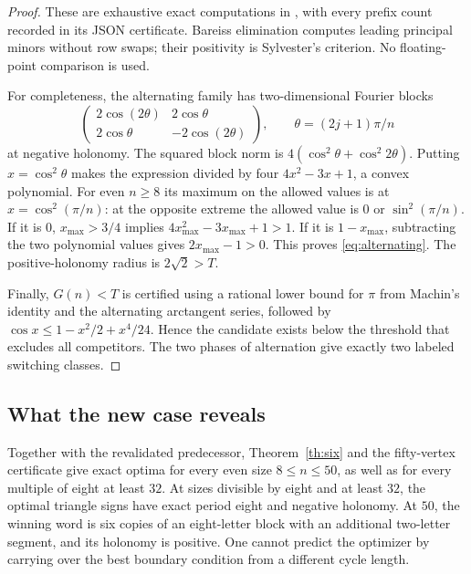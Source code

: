 \begin{proof}
These are exhaustive exact computations in
, with every prefix count
recorded in its JSON certificate. Bareiss elimination computes leading
principal minors without row swaps; their positivity is Sylvester's
criterion. No floating-point comparison is used.

For completeness, the alternating family has two-dimensional Fourier
blocks
\[
\begin{pmatrix}
2\cos(2\theta)&2\cos\theta\\
2\cos\theta&-2\cos(2\theta)
\end{pmatrix},
\qquad \theta=(2j+1)\pi/n
\]
at negative holonomy. The squared block norm is
\(4(\cos^2\theta+\cos^2 2\theta)\).
Putting \(x=\cos^2\theta\) makes the expression divided by four
\(4x^2-3x+1\), a convex polynomial. For even \(n\ge8\) its maximum on
the allowed values is at \(x=\cos^2(\pi/n)\): at the opposite extreme
the allowed value is \(0\) or \(\sin^2(\pi/n)\). If it is \(0\),
\(x_{\max}>3/4\) implies \(4x_{\max}^2-3x_{\max}+1>1\).
If it is \(1-x_{\max}\), subtracting the two polynomial values gives
\(2x_{\max}-1>0\).
This proves \eqref{eq:alternating}.
The positive-holonomy radius is \(2\sqrt2>T\).

Finally, \(G(n)<T\) is certified using a rational lower bound for \(\pi\)
from Machin's identity and the alternating arctangent series, followed
by \(\cos x\le1-x^2/2+x^4/24\). Hence the candidate exists below the
threshold that excludes all competitors. The two phases of alternation
give exactly two labeled switching classes.
\end{proof}



\subsection{What the new case reveals}

Together with the revalidated predecessor, Theorem~\ref{th:six} and the
fifty-vertex certificate give exact optima for every even size
\(8\le n\le50\), as well as for every multiple of eight at least \(32\).
At sizes divisible by eight and at least \(32\), the optimal triangle
signs have exact period eight and negative holonomy. At \(50\), the winning
word is six copies of an eight-letter block with an additional two-letter
segment, and its holonomy is positive. One cannot predict the optimizer by
carrying over the best boundary condition from a different cycle length.

